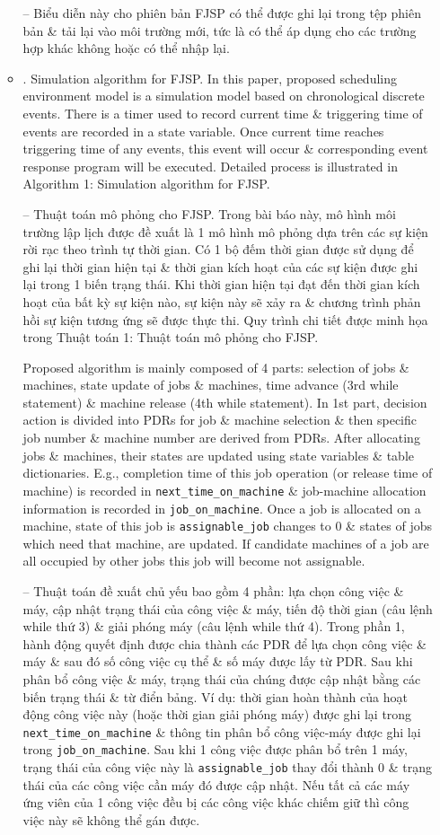 \documentclass{article}
\begin{document}
\begin{itemize}
\begin{itemize}
        -- Biểu diễn này cho phiên bản FJSP có thể được ghi lại trong tệp phiên bản \& tải lại vào môi trường mới, tức là có thể áp dụng cho các trường hợp khác không hoặc có thể nhập lại.
        \item {. Simulation algorithm for FJSP.} In this paper, proposed scheduling environment model is a simulation model based on chronological discrete events. There is a timer used to record current time \& triggering time of events are recorded in a state variable. Once current time reaches triggering time of any events, this event will occur \& corresponding event response program will be executed. Detailed process is illustrated in {\sf Algorithm 1: Simulation algorithm for FJSP}.

        -- {\sf Thuật toán mô phỏng cho FJSP.} Trong bài báo này, mô hình môi trường lập lịch được đề xuất là 1 mô hình mô phỏng dựa trên các sự kiện rời rạc theo trình tự thời gian. Có 1 bộ đếm thời gian được sử dụng để ghi lại thời gian hiện tại \& thời gian kích hoạt của các sự kiện được ghi lại trong 1 biến trạng thái. Khi thời gian hiện tại đạt đến thời gian kích hoạt của bất kỳ sự kiện nào, sự kiện này sẽ xảy ra \& chương trình phản hồi sự kiện tương ứng sẽ được thực thi. Quy trình chi tiết được minh họa trong {\sf Thuật toán 1: Thuật toán mô phỏng cho FJSP}.

        Proposed algorithm is mainly composed of 4 parts: selection of jobs \& machines, state update of jobs \& machines, time advance (3rd while statement) \& machine release (4th while statement). In 1st part, decision action is divided into PDRs for job \& machine selection \& then specific job number \& machine number are derived from PDRs. After allocating jobs \& machines, their states are updated using state variables \& table dictionaries. E.g., completion time of this job operation (or release time of machine) is recorded in \verb|next_time_on_machine| \& job-machine allocation information is recorded in \verb|job_on_machine|. Once a job is allocated on a machine, state of this job is \verb|assignable_job| changes to 0 \& states of jobs which need that machine, are updated. If candidate machines of a job are all occupied by other jobs this job will become not assignable.

        -- Thuật toán đề xuất chủ yếu bao gồm 4 phần: lựa chọn công việc \& máy, cập nhật trạng thái của công việc \& máy, tiến độ thời gian (câu lệnh while thứ 3) \& giải phóng máy (câu lệnh while thứ 4). Trong phần 1, hành động quyết định được chia thành các PDR để lựa chọn công việc \& máy \& sau đó số công việc cụ thể \& số máy được lấy từ PDR. Sau khi phân bổ công việc \& máy, trạng thái của chúng được cập nhật bằng các biến trạng thái \& từ điển bảng. Ví dụ: thời gian hoàn thành của hoạt động công việc này (hoặc thời gian giải phóng máy) được ghi lại trong \verb|next_time_on_machine| \& thông tin phân bổ công việc-máy được ghi lại trong \verb|job_on_machine|. Sau khi 1 công việc được phân bổ trên 1 máy, trạng thái của công việc này là \verb|assignable_job| thay đổi thành 0 \& trạng thái của các công việc cần máy đó được cập nhật. Nếu tất cả các máy ứng viên của 1 công việc đều bị các công việc khác chiếm giữ thì công việc này sẽ không thể gán được.


\end{itemize}
\end{itemize}
\end{document}
